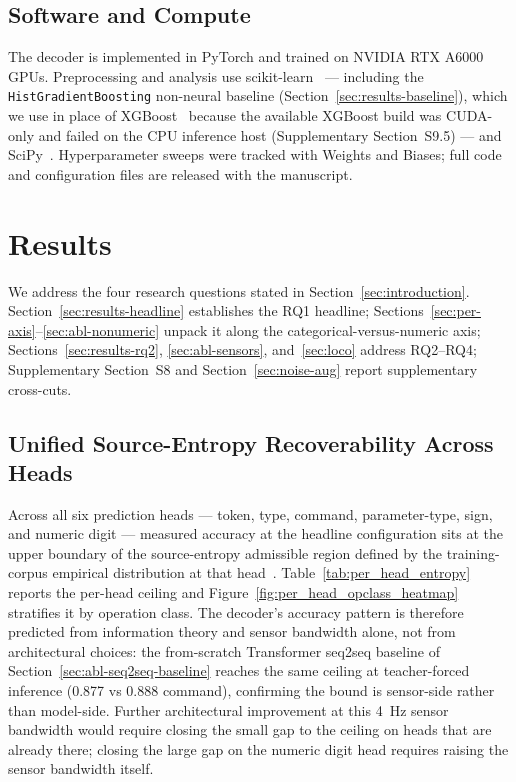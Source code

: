 \documentclass[sensors,article,submit,moreauthors,pdftex]{Definitions/mdpi}
\begin{document}
\subsection{Software and Compute}
\label{sec:software}

The decoder is implemented in PyTorch and trained on NVIDIA RTX A6000 GPUs. Preprocessing and analysis use scikit-learn~\cite{pedregosa2011sklearn} --- including the \texttt{HistGradientBoosting} non-neural baseline (Section~\ref{sec:results-baseline}), which we use in place of XGBoost~\cite{chen2016xgboost} because the available XGBoost build was CUDA-only and failed on the CPU inference host (Supplementary Section~S9.5) --- and SciPy~\cite{virtanen2020scipy}. Hyperparameter sweeps were tracked with Weights and Biases; full code and configuration files are released with the manuscript.

\section{Results}
\label{sec:experiments}

We address the four research questions stated in Section~\ref{sec:introduction}. Section~\ref{sec:results-headline} establishes the RQ1 headline; Sections~\ref{sec:per-axis}--\ref{sec:abl-nonumeric} unpack it along the categorical-versus-numeric axis; Sections~\ref{sec:results-rq2}, \ref{sec:abl-sensors}, and~\ref{sec:loco} address RQ2--RQ4; Supplementary Section~S8 and Section~\ref{sec:noise-aug} report supplementary cross-cuts.

\subsection{Unified Source-Entropy Recoverability Across Heads}
\label{sec:unified-entropy}

Across all six prediction heads --- token, type, command, parameter-type, sign, and numeric digit --- measured accuracy at the headline configuration sits at the upper boundary of the source-entropy admissible region defined by the training-corpus empirical distribution at that head~\cite{brown1992englishentropy,feder1994relations}. Table~\ref{tab:per_head_entropy} reports the per-head ceiling and Figure~\ref{fig:per_head_opclass_heatmap} stratifies it by operation class. The decoder's accuracy pattern is therefore predicted from information theory and sensor bandwidth alone, not from architectural choices: the from-scratch Transformer seq2seq baseline of Section~\ref{sec:abl-seq2seq-baseline} reaches the same ceiling at teacher-forced inference (0.877 vs 0.888 command), confirming the bound is sensor-side rather than model-side. Further architectural improvement at this 4~Hz sensor bandwidth would require closing the small gap to the ceiling on heads that are already there; closing the large gap on the numeric digit head requires raising the sensor bandwidth itself.
\end{document}
